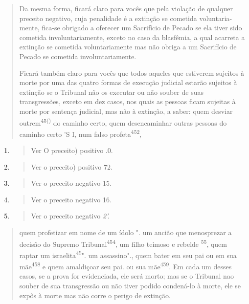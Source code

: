 \begin{quote}
Da mesma forma, ficará claro para vocês que pela violação de qual­quer
preceito negativo, cuja penalidade é a extinção se cometida
voluntaria­mente, fica-se obrigado a oferecer um Sacrifício de Pecado se
ela tiver sido co­metida involuntariamente, exceto no caso da blasfêmia,
a qual acarreta a extin­ção se cometida voluntariamente mas não obriga a
um Sacrifício de Pecado se cometida involuntariamente.

Ficará também claro para vocês que todos aqueles que estiverem su­jeitos
à morte por uma das quatro formas de execução judicial estarão sujeitos
à extinção se o Tribunal não os executar ou não souber de suas
transgressões, exceto em dez casos, nos quais as pessoas ficam sujeitas
à morte por sentença judicial, mas não à extinção, a saber: quem desviar
outrem\textsuperscript{45()} do caminho certo, quem desencaminhar outras
pessoas do caminho certo 'S I, num falso profeta\textsuperscript{452},
\end{quote}

\begin{enumerate}
\def\labelenumi{\arabic{enumi}.}
\setcounter{enumi}{447}
\item
 \begin{quote}
 Ver O preceito) positivo .0.
 \end{quote}
\item
 \begin{quote}
 Ver o preceito) positivo 72.
 \end{quote}
\item
 \begin{quote}
 Ver o preceito negativo 15.
 \end{quote}
\item
 \begin{quote}
 Ver o preceito negativo 16.
 \end{quote}
\item
 \begin{quote}
 Ver o preceito negativo \emph{2'.}
 \end{quote}
\end{enumerate}

\begin{quote}quem profetizar em nome de um ídolo 
". um ancião que
menosprezar a deci­são do Supremo Tribunal\textsuperscript{454}, um
filho teimoso e rebelde \textsuperscript{55}, quem raptar um
israelita\textsuperscript{45}". um assassino"., quem
bater em seu pai ou em sua mãe\textsuperscript{458} e quem amaldiçoar
seu pai. ou sua mãe\textsuperscript{459}. Em cada um desses casos, se a
prova for evi­denciada, ele será morto; mas se o Tribunal nao souber de
sua transgressão ou não tiver podido condená-lo à morte, ele se expôs à
morte mas não corre o perigo de extinção.
\end{quote}


